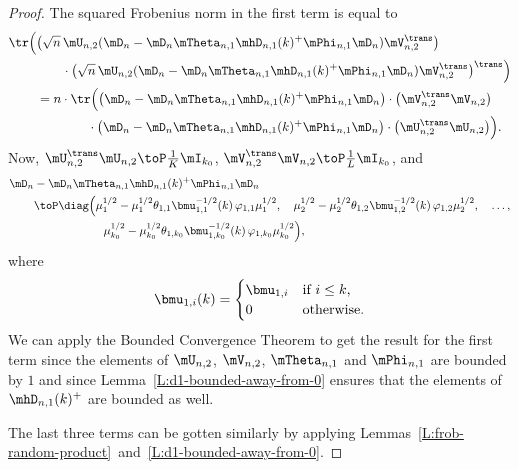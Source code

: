 \begin{proof}
	The squared Frobenius norm in the first term is equal to
	\begin{align*}
		\tr\Big(
			&\big(
				\sqrt{n} \,
				\mU_{n,2} 
				( 
					\mD_n 
					- 
					\mD_n 
					\mTheta_{n,1} \mhD_{n,1}(k)^+ \mPhi_{n,1}
					\mD_n
				)
				\mV_{n,2}^\trans 
			\big) \\
			&\qquad\cdot
			\big(
				\sqrt{n} \,
				\mU_{n,2} 
				( 
					\mD_n 
					- 
					\mD_n 
					\mTheta_{n,1} \mhD_{n,1}(k)^+ \mPhi_{n,1}
					\mD_n
				)
				\mV_{n,2}^\trans 
			\big)^\trans
		\Big) \\
		&=
			n
			\cdot
			\tr\Big(
				\big( 
					\mD_n 
					- 
					\mD_n 
					\mTheta_{n,1} \mhD_{n,1}(k)^+ \mPhi_{n,1}
					\mD_n
				\big)
				\cdot
				\big(
					\mV_{n,2}^\trans 
					\mV_{n,2}
				\big) \\
				&\qquad\qquad\cdot
				\big( 
					\mD_n 
					- 
					\mD_n 
					\mTheta_{n,1} \mhD_{n,1}(k)^+ \mPhi_{n,1}
					\mD_n
				\big)
				\cdot
				\big(
					\mU_{n,2}^\trans
					\mU_{n,2} 
				\big) 
			\Big).
	\end{align*}
	Now, 
		$\mU_{n,2}^\trans \mU_{n,2} \toP \frac{1}{K} \mI_{k_0}$,
		$\mV_{n,2}^\trans \mV_{n,2} \toP \frac{1}{L} \mI_{k_0}$,
	and
	\begin{align*}
		\mD_n &- \mD_n \mTheta_{n,1} \mhD_{n,1}(k)^+ \mPhi_{n,1} \mD_n \\
			&\toP
				\diag\Big(
					\mu_1^{1/2}
					-
					\mu_1^{1/2}
					\theta_{1,1}
					\bmu_{1,1}^{-1/2}(k) \,
					\varphi_{1,1}
					\mu_1^{1/2},
					\quad
					\mu_2^{1/2}
					-
					\mu_2^{1/2}
					\theta_{1,2}
					\bmu_{1,2}^{-1/2}(k) \,
					\varphi_{1,2}
					\mu_2^{1/2},
					\quad
					\ldots, \\
					&\qquad\qquad\qquad
					\mu_{k_0}^{1/2}
					-
					\mu_{k_0}^{1/2}
					\theta_{1,k_0}
					\bmu_{1,k_0}^{-1/2}(k) \,
					\varphi_{1,k_0}
					\mu_{k_0}^{1/2} 
				\Big),
	\end{align*}
	where
	\[
		\bmu_{1,i}(k) 
			=
			\begin{cases}
				\bmu_{1,i} &\text{if $i \leq k$,} \\
				0          &\text{otherwise.}
			\end{cases}
	\]
	We can apply the Bounded Convergence Theorem to get the result for the 
	first
	term since the elements of $\mU_{n,2}$, $\mV_{n,2}$, $\mTheta_{n,1}$ 
	and $\mPhi_{n,1}$ are bounded by $1$ and since
	Lemma~\ref{L:d1-bounded-away-from-0} ensures that the elements of
	$\mhD_{n,1}(k)^+$ are bounded as well.
	
	The last three terms can be gotten similarly by applying
	Lemmas~\ref{L:frob-random-product}~and~\ref{L:d1-bounded-away-from-0}.
\end{proof}

